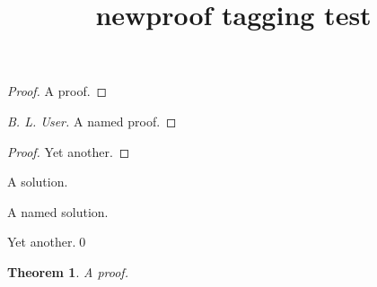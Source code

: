 \documentclass{article}
\title{newproof tagging test}
\newtheorem{theorem}{Theorem}
\begin{document}
\begin{proof}
A proof.
\end{proof}

\begin{proof}[B. L. User]
A named proof.
\end{proof}

\begin{proof}
Yet another.
\end{proof}

\begin{solution}
A solution.
\end{solution}

\begin{solution}[B. L. User]
A named solution.
\end{solution}

\begin{solution}
Yet another.\qed
\end{solution}

\begin{theorem}
A proof.
\end{theorem}
\end{document}
